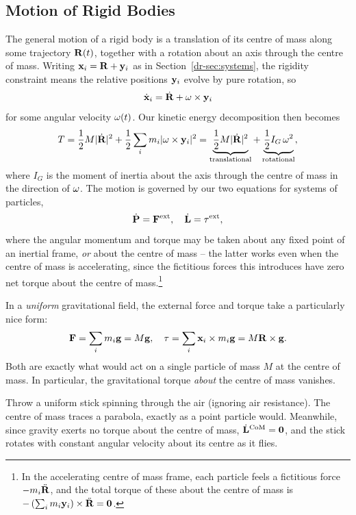 \documentclass[a4paper]{scrartcl}
\begin{document}
\subsection{Motion of Rigid Bodies}

The general motion of a rigid body is a translation of its centre of mass along some trajectory $\mathbf{R}(t)$, together with a rotation about an axis through the centre of mass. Writing $\mathbf{x}_i = \mathbf{R} + \mathbf{y}_i$ as in Section~\ref{dr-sec:systems}, the rigidity constraint means the relative positions $\mathbf{y}_i$ evolve by pure rotation, so
$$
\dot{\mathbf{x}}_i = \dot{\mathbf{R}} + \mathbf{\omega} \times \mathbf{y}_i
$$
for some angular velocity $\mathbf{\omega}(t)$. Our kinetic energy decomposition then becomes
$$
T = \frac{1}{2}M |\dot{\mathbf{R}}|^2 + \frac{1}{2}\sum_i m_i |\mathbf{\omega} \times \mathbf{y}_i|^2 = \underbrace{\frac{1}{2}M|\dot{\mathbf{R}}|^2}_{\text{translational}} + \underbrace{\frac{1}{2}I_G\, \omega^2}_{\text{rotational}},
$$
where $I_G$ is the moment of inertia about the axis through the centre of mass in the direction of $\mathbf{\omega}$. The motion is governed by our two equations for systems of particles,
$$
\dot{\mathbf{P}} = \mathbf{F}^{\text{ext}}, \quad \dot{\mathbf{L}} = \mathbf{\tau}^{\text{ext}},
$$
where the angular momentum and torque may be taken about any fixed point of an inertial frame, \emph{or} about the centre of mass -- the latter works even when the centre of mass is accelerating, since the fictitious forces this introduces have zero net torque about the centre of mass.\footnote{In the accelerating centre of mass frame, each particle feels a fictitious force $-m_i \ddot{\mathbf{R}}$, and the total torque of these about the centre of mass is $-\left(\sum_i m_i \mathbf{y}_i\right) \times \ddot{\mathbf{R}} = \mathbf{0}$.}

In a \emph{uniform} gravitational field, the external force and torque take a particularly nice form:
$$
\mathbf{F} = \sum_i m_i \mathbf{g} = M \mathbf{g}, \quad \mathbf{\tau} = \sum_i \mathbf{x}_i \times m_i \mathbf{g} = M \mathbf{R} \times \mathbf{g}.
$$
Both are exactly what would act on a single particle of mass $M$ at the centre of mass. In particular, the gravitational torque \emph{about} the centre of mass vanishes.

\begin{example}
	Throw a uniform stick spinning through the air (ignoring air resistance). The centre of mass traces a parabola, exactly as a point particle would. Meanwhile, since gravity exerts no torque about the centre of mass, $\dot{\mathbf{L}}^{\text{CoM}} = \mathbf{0}$, and the stick rotates with constant angular velocity about its centre as it flies.
\end{example}
\end{document}
